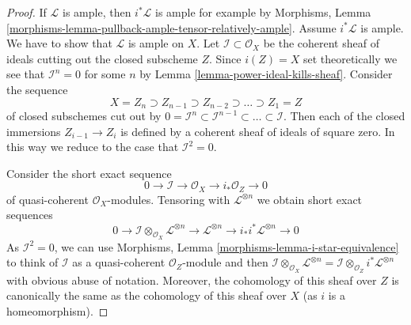 \documentclass{stacks-project}
\theoremstyle{plain}
\theoremstyle{definition}
\theoremstyle{remark}
\numberwithin{equation}{subsection}
\begin{document}
\begin{proof}
If $\mathcal{L}$ is ample, then $i^*\mathcal{L}$ is ample for
example by Morphisms, Lemma
\ref{morphisms-lemma-pullback-ample-tensor-relatively-ample}.
Assume $i^*\mathcal{L}$ is ample. We have to show that $\mathcal{L}$
is ample on $X$.
Let $\mathcal{I} \subset \mathcal{O}_X$ be the coherent sheaf of ideals
cutting out the closed subscheme $Z$. Since $i(Z) = X$ set theoretically
we see that $\mathcal{I}^n = 0$ for some $n$ by
Lemma \ref{lemma-power-ideal-kills-sheaf}.
Consider the sequence
$$
X = Z_n \supset Z_{n - 1} \supset Z_{n - 2} \supset \ldots \supset Z_1 = Z
$$
of closed subschemes cut out by
$0 = \mathcal{I}^n \subset \mathcal{I}^{n - 1} \subset \ldots \subset
\mathcal{I}$. Then each of the closed immersions $Z_{i - 1} \to Z_{i}$
is defined by a coherent sheaf of ideals of square zero. In this way
we reduce to the case that $\mathcal{I}^2 = 0$.

\medskip\noindent
Consider the short exact sequence
$$
0 \to \mathcal{I} \to \mathcal{O}_X \to i_*\mathcal{O}_Z \to 0
$$
of quasi-coherent $\mathcal{O}_X$-modules. Tensoring with
$\mathcal{L}^{\otimes n}$ we obtain short exact sequences
\begin{equation}
\label{equation-ses}
0 \to \mathcal{I} \otimes_{\mathcal{O}_X} \mathcal{L}^{\otimes n}
\to \mathcal{L}^{\otimes n} \to i_*i^*\mathcal{L}^{\otimes n} \to 0
\end{equation}
As $\mathcal{I}^2 = 0$, we can use
Morphisms, Lemma \ref{morphisms-lemma-i-star-equivalence}
to think of $\mathcal{I}$ as a quasi-coherent $\mathcal{O}_Z$-module
and then $\mathcal{I} \otimes_{\mathcal{O}_X} \mathcal{L}^{\otimes n} =
\mathcal{I} \otimes_{\mathcal{O}_Z} i^*\mathcal{L}^{\otimes n}$ with
obvious abuse of notation.
Moreover, the cohomology of this sheaf over $Z$ is canonically
the same as the cohomology of this sheaf over $X$ (as $i$ is a
homeomorphism).


\end{proof}
\end{document}
